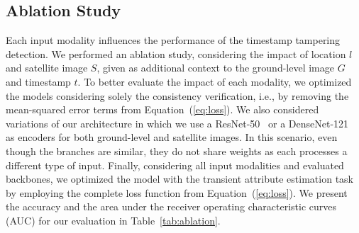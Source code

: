 \documentclass[journal]{IEEEtran}
\begin{document}
     
    
     
    \subsection{Ablation Study}\label{sec:exp_ablation}
    
        Each input modality influences the performance of the timestamp tampering detection. We performed an ablation study, considering the impact of location $l$ and satellite image $S$, given as additional context to the ground-level image $G$ and timestamp $t$. To better evaluate the impact of each modality, we optimized the models considering solely the consistency verification, i.e., by removing the mean-squared error terms from Equation~(\ref{eq:loss}). We also considered variations of our architecture in which we use a ResNet-50~\cite{he2016identity} or a DenseNet-121~\cite{huang2017densely} as encoders for both ground-level and satellite images. In this scenario, even though the branches are similar, they do not share weights as each processes a different type of input. Finally, considering all input modalities and evaluated backbones, we optimized the model with the transient attribute estimation task by employing the complete loss function from Equation~(\ref{eq:loss}). We present the accuracy and the area under the receiver operating characteristic curves (AUC) for our evaluation in Table~\ref{tab:ablation}.
        
\end{document}
